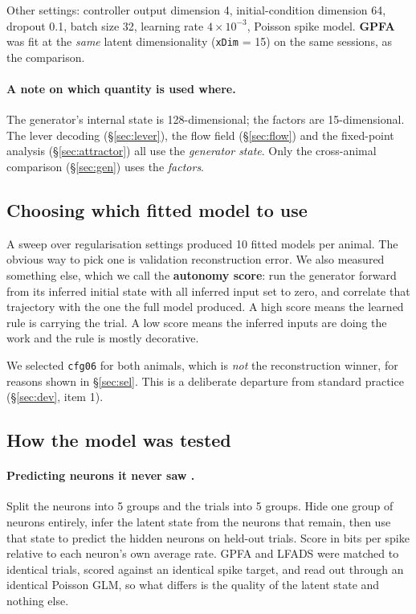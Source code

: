 \documentclass[11pt]{article}
\begin{document}
Other settings: controller output dimension 4, initial-condition dimension 64,
dropout 0.1, batch size 32, learning rate $4\times10^{-3}$, Poisson spike model.
\textbf{GPFA} \cite{yu2009} was fit at the \emph{same} latent dimensionality
(\texttt{xDim} = 15) on the same sessions, as the comparison.

\paragraph{A note on which quantity is used where.} The generator's internal
state is 128-dimensional; the factors are 15-dimensional. The lever decoding
(\S\ref{sec:lever}), the flow field (\S\ref{sec:flow}) and the fixed-point
analysis (\S\ref{sec:attractor}) all use the \emph{generator state}. Only the
cross-animal comparison (\S\ref{sec:gen}) uses the \emph{factors}.

\subsection{Choosing which fitted model to use}\label{sec:selmethod}

A sweep over regularisation settings produced 10 fitted models per animal. The
obvious way to pick one is validation reconstruction error. We also measured
something else, which we call the \textbf{autonomy score}: run the generator
forward from its inferred initial state with all inferred input set to zero, and
correlate that trajectory with the one the full model produced. A high score
means the learned rule is carrying the trial. A low score means the inferred
inputs are doing the work and the rule is mostly decorative.

We selected \texttt{cfg06} for both animals, which is \emph{not} the
reconstruction winner, for reasons shown in \S\ref{sec:sel}. This is a deliberate
departure from standard practice (\S\ref{sec:dev}, item 1).

\subsection{How the model was tested}

\paragraph{Predicting neurons it never saw \cite{pei2021}.} Split the neurons
into 5 groups and the trials into 5 groups. Hide one group of neurons entirely,
infer the latent state from the neurons that remain, then use that state to
predict the hidden neurons on held-out trials. Score in bits per spike relative
to each neuron's own average rate. GPFA and LFADS were matched to identical
trials, scored against an identical spike target, and read out through an
identical Poisson GLM, so what differs is the quality of the latent state and
nothing else.
\end{document}
